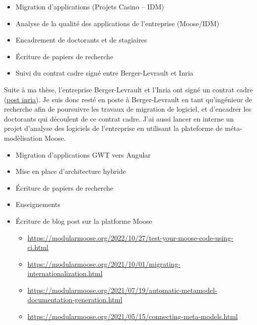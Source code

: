 \documentclass[10pt,a4paper,ragged2e,withhyper]{altacv}
\begin{document}
\newpage



\begin{itemize}
  \item Migration d'applications (Projets Casino -- IDM)
  \item Analyse de la qualité des applications de l'entreprise (Moose/IDM)
  \item Encadrement de doctorants et de stagiaires
  \item Écriture de papiers de recherche
  \item Suivi du contrat cadre signé entre Berger-Levrault et Inria
\end{itemize}

Suite à ma thèse, l'entreprise Berger-Levrault et l'Inria ont signé un contrat cadre (\href{https://www.inria.fr/fr/berger-levrault-inria-partenariat-numerique-responsable}{\color{blue}\underline{post inria}}).
Je suis donc resté en poste à Berger-Levrault en tant qu'ingénieur de recherche afin de poursuivre les travaux de migration de logiciel, et d'encadrer les doctorants qui découlent de ce contrat cadre.
J'ai aussi lancer en interne un projet d'analyse des logiciels de l'entreprise en utilisant la plateforme de méta-modèlisation Moose.

\divider

\begin{itemize}
\item Migration d'applications GWT vers Angular
\item Mise en place d'architecture hybride
\item Écriture de papiers de recherche
\item Enseignements
\item Écriture de blog post sur la platforme Moose
\begin{itemize}
  \item \url{https://modularmoose.org/2022/10/27/test-your-moose-code-using-ci.html}
  \item \url{https://modularmoose.org/2021/10/01/migrating-internationalization.html}
  \item \url{https://modularmoose.org/2021/07/19/automatic-metamodel-documentation-generation.html}
  \item \url{https://modularmoose.org/2021/05/15/connecting-meta-models.html}
\end{itemize}

\end{itemize}
\end{document}

